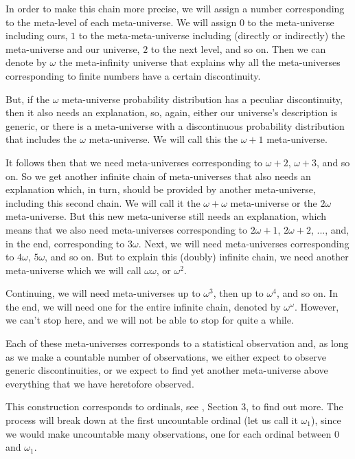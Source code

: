 \documentclass[a4paper
,draft
]{article}
\begin{document}
In order to make this chain more precise, we will assign a number corresponding
to the meta-level of each meta-universe.
We will assign $0$ to the meta-universe including ours, $1$ to the
meta-meta-universe including (directly or indirectly) the meta-universe and our
universe, $2$ to the next level, and so on.
Then we can denote by $\omega$ the meta-infinity universe that explains why all
the meta-universes corresponding to finite numbers have a certain discontinuity.

But, if the $\omega$ meta-universe probability distribution has a peculiar
discontinuity, then it also needs an explanation, so, again,
either our universe's
description is generic, or there is a meta-universe with a discontinuous
probability distribution that includes the
$\omega$ meta-universe.
We will call this the $\omega + 1$ meta-universe.

It follows then that we need meta-universes corresponding to $\omega + 2$,
$\omega + 3$, and so on.
So we get another infinite chain of meta-universes that also needs an
explanation which, in turn, should be provided by another meta-universe, including this
second chain. We will call it the $\omega + \omega$ meta-universe
or the $2\omega$ meta-universe.
But this new meta-universe still needs an explanation,
which means that we also need
meta-universes corresponding to $2\omega + 1$, $2\omega + 2$, ..., and,
in the end, corresponding to $3\omega$.
Next, we will need meta-universes
corresponding to $4\omega$, $5\omega$, and so on.
But to explain this (doubly) infinite chain,
we need another meta-universe which we
will call $\omega\omega$, or $\omega^2$.

Continuing, we will need meta-universes up to $\omega^3$, then up to
$\omega^4$, and so on.
In the end, we will need one for the entire
infinite chain, denoted by $\omega^\omega$.
However, we can't stop here, and we will not be able to stop for quite a while.

Each of these meta-universes corresponds to a statistical observation and,
as long as we make a countable number of observations, we either expect to
observe generic discontinuities, or we expect to find yet another meta-universe
above everything that we have heretofore observed.

This construction corresponds to ordinals, see \textcite{Cohen1966}, Section 3,
to find out more.
The process will break down at the first uncountable ordinal (let us call it
$\omega_1$), since we would make
uncountable many observations, one for each ordinal between $0$ and $\omega_1$.
\end{document}
